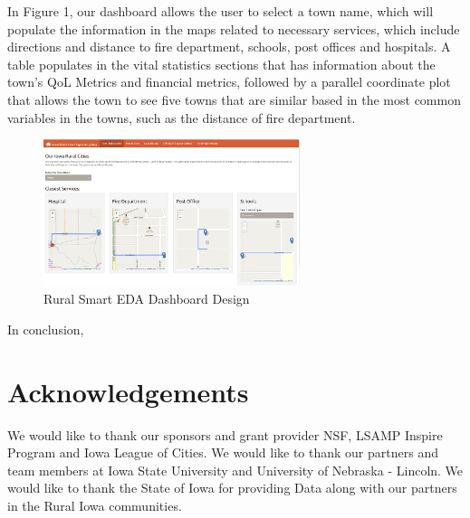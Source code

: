\documentclass[10pt]{article}\usepackage[]{graphicx}\usepackage[]{color}
\begin{document}
In Figure 1, our dashboard allows the user to select a town name, which will populate the information in the maps related to necessary services, which include directions and distance to fire department, schools, post offices and hospitals. A table populates in the vital statistics sections that has information about the town's QoL Metrics and financial metrics, followed by a parallel coordinate plot that allows the town to see five towns that are similar based in the most common variables in the towns, such as the distance of fire department. 

\begin{figure}[ht!]
\centering
\includegraphics[width=75mm]{SCC_Dashboard.png}
\caption{Rural Smart EDA Dashboard Design}
\end{figure}

In conclusion, 



\section{Acknowledgements}
We would like to thank our sponsors and grant provider NSF, LSAMP Inspire Program and Iowa League of Cities. We would like to thank our partners and team members at Iowa State University and University of Nebraska - Lincoln. We would like to thank the State of Iowa for providing Data along with our partners in the Rural Iowa communities.



\end{document}
